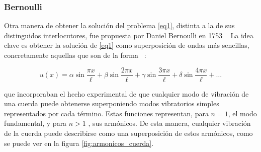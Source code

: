 \subsubsection{Bernoulli}
Otra manera de obtener la solución del problema \ref{eq1}, distinta a la de sus distinguidos interlocutores, fue propuesta por Daniel Bernoulli en 1753 ~\cite{bernoulli_Mechanics} La idea clave es obtener la solución de \ref{eq1} como superposición de ondas más sencillas, concretamente aquellas que son de la forma ~\cite{springer1999Physics}:

\begin{equation}\label{eq9}	
	u(x) = \alpha \sin \frac{\pi x}{\ell} + \beta \sin \frac{2\pi x}{\ell} + \gamma \sin \frac{3\pi x}{\ell} + \delta \sin \frac{4\pi x}{\ell} + \dots
\end{equation}

que incorporaban el hecho experimental de que cualquier modo de vibración de una cuerda puede obtenerse superponiendo modos vibratorios simples representados por cada término. Estas funciones representan, para \( n = 1 \), el modo fundamental, y para \( n > 1 \) , sus armónicos. De esta manera, cualquier vibración de la cuerda puede describirse como una superposición de estos armónicos, como se puede ver en la figura \ref{fig:armonicos_cuerda}.

